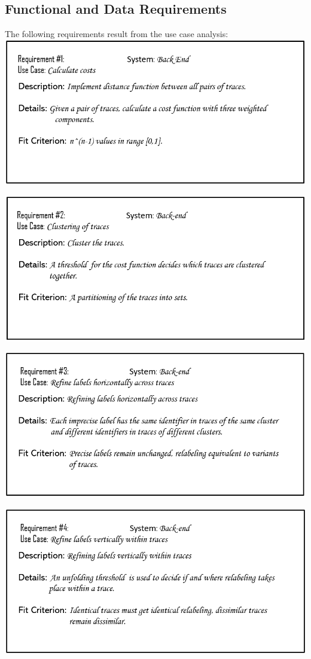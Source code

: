 \documentclass[notitlepage]{article}
\begin{document}
\begin{flushleft}
\subsection{Functional and Data Requirements}
The following requirements result from the use case analysis:\\
\medskip
\includegraphics[scale=0.6]{reqq1.png}

\includegraphics[scale=0.6]{reqq2.png}

\includegraphics[scale=0.6]{reqq3.png}

\includegraphics[scale=0.6]{reqq4.png}


\end{flushleft}
\end{document}
